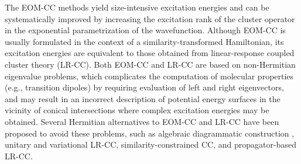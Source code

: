 The EOM-CC methods yield size-intensive excitation energies
\cite{Koch:1990p3345,Koch:1990p3333}
and can be
systematically improved by increasing the excitation rank of the cluster
operator in the exponential parametrization of the wavefunction. Although EOM-CC
is usually formulated in the context of a similarity-transformed Hamiltonian,
its excitation energies are equivalent to those obtained from linear-response
coupled cluster theory (LR-CC).
\cite{Sekino:1984p255,Koch:1990p3345,Koch:1990p3333}
Both EOM-CC and LR-CC are based on 
non-Hermitian eigenvalue problems,
which complicates the computation of molecular properties (e.g., transition dipoles)
by requiring evaluation of left and right eigenvectors, 
\cite{Stanton:1993p8840,Stanton:1994p4695,Stanton:1994p8938,Levchenko:2005p224106}
and may result in an incorrect description of potential energy surfaces in the
vicinity of conical intersections where complex excitation energies may be
obtained.\cite{Hattig:2005p37,Kohn:2007p044105,Kjonstad:2017p164105}
Several Hermitian alternatives to EOM-CC and LR-CC have been
proposed to avoid these problems, such as  
algebraic diagrammatic construction
\cite{Schirmer:1982p2395,Schirmer:1991p4647,Dreuw:2014p82}, 
unitary and variational LR-CC,
\cite{Taube:2006p3393,Kats:2011p062503,Walz:2012p052519}
similarity-constrained CC,
\cite{Kjonstad:2017p4801}
and propagator-based LR-CC.
\cite{Moszynski:2005p1109,Korona:2010p14977}

